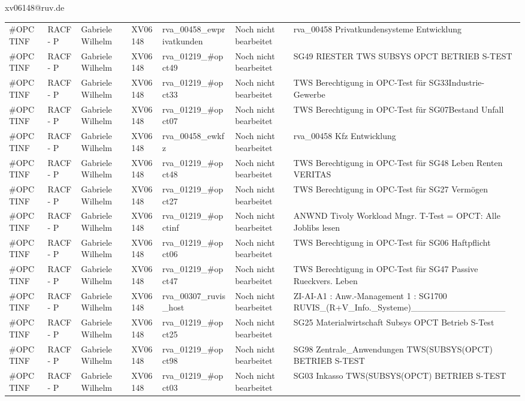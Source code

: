 \documentclass[a4paper,landscape,12pt]{letter}
\begin{document}
\begin{letter}{xv06148@ruv.de\hfill \break}
\begin{tiny}
\begin{longtable}{|p{35mm}|p{15mm}|p{25mm}|p{10mm}|p{40mm}|p{50mm}|p{50mm}|}
\#OPCTINF & RACF - P & Gabriele Wilhelm & XV06148 & rva\_00458\_ewprivatkunden & Noch nicht bearbeitet & rva\_00458 Privatkundensysteme Entwicklung \\
\#OPCTINF & RACF - P & Gabriele Wilhelm & XV06148 & rva\_01219\_\#opct49 & Noch nicht bearbeitet & SG49 RIESTER TWS SUBSYS OPCT BETRIEB S-TEST \\
\#OPCTINF & RACF - P & Gabriele Wilhelm & XV06148 & rva\_01219\_\#opct33 & Noch nicht bearbeitet & TWS Berechtigung in OPC-Test für SG33Industrie-Gewerbe \\
\#OPCTINF & RACF - P & Gabriele Wilhelm & XV06148 & rva\_01219\_\#opct07 & Noch nicht bearbeitet & TWS Berechtigung in OPC-Test für SG07Bestand Unfall \\
\#OPCTINF & RACF - P & Gabriele Wilhelm & XV06148 & rva\_00458\_ewkfz & Noch nicht bearbeitet & rva\_00458 Kfz Entwicklung \\
\#OPCTINF & RACF - P & Gabriele Wilhelm & XV06148 & rva\_01219\_\#opct48 & Noch nicht bearbeitet & TWS Berechtigung in OPC-Test für SG48 Leben Renten VERITAS \\
\#OPCTINF & RACF - P & Gabriele Wilhelm & XV06148 & rva\_01219\_\#opct27 & Noch nicht bearbeitet & TWS Berechtigung in OPC-Test für SG27 Vermögen \\
\#OPCTINF & RACF - P & Gabriele Wilhelm & XV06148 & rva\_01219\_\#opctinf & Noch nicht bearbeitet & ANWND Tivoly Workload Mngr. T-Test = OPCT: Alle Joblibs lesen \\
\#OPCTINF & RACF - P & Gabriele Wilhelm & XV06148 & rva\_01219\_\#opct06 & Noch nicht bearbeitet & TWS Berechtigung in OPC-Test für SG06 Haftpflicht \\
\#OPCTINF & RACF - P & Gabriele Wilhelm & XV06148 & rva\_01219\_\#opct47 & Noch nicht bearbeitet & TWS Berechtigung in OPC-Test für SG47 Passive Rueckvers. Leben \\
\#OPCTINF & RACF - P & Gabriele Wilhelm & XV06148 & rva\_00307\_ruvis\_host & Noch nicht bearbeitet & ZI-AI-A1   : Anw.-Management 1 : SG1700 RUVIS\_(R+V\_Info.\_Systeme)\_\_\_\_\_\_\_\_\_\_\_\_\_\_\_ \\
\#OPCTINF & RACF - P & Gabriele Wilhelm & XV06148 & rva\_01219\_\#opct25 & Noch nicht bearbeitet & SG25 Materialwirtschaft Subsys OPCT Betrieb S-Test \\
\#OPCTINF & RACF - P & Gabriele Wilhelm & XV06148 & rva\_01219\_\#opct98 & Noch nicht bearbeitet & SG98 Zentrale\_Anwendungen TWS(SUBSYS(OPCT) BETRIEB S-TEST \\
\#OPCTINF & RACF - P & Gabriele Wilhelm & XV06148 & rva\_01219\_\#opct03 & Noch nicht bearbeitet & SG03 Inkasso TWS(SUBSYS(OPCT) BETRIEB S-TEST \\

\end{longtable}
\end{tiny}
\end{letter}
\end{document}
